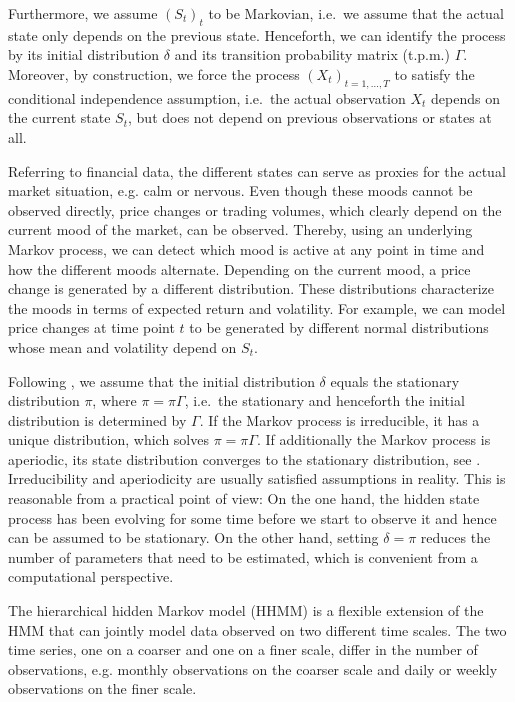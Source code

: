 \documentclass[article]{jss}
\begin{document}
Furthermore, we assume $(S_t)_t$ to be Markovian, i.e.\ we assume that the actual state only depends on the previous state. Henceforth, we can identify the process by its initial distribution $\delta$ and its transition probability matrix (t.p.m.) $\Gamma$. Moreover, by construction, we force the process $(X_t)_{t = 1, \ldots, T}$ to satisfy the conditional independence assumption, i.e.\ the actual observation $X_t$ depends on the current state $S_t$, but does not depend on previous observations or states at all.

Referring to financial data, the different states can serve as proxies for the actual market situation, e.g. calm or nervous. Even though these moods cannot be observed directly, price changes or trading volumes, which clearly depend on the current mood of the market, can be observed. Thereby, using an underlying Markov process, we can detect which mood is active at any point in time and how the different moods alternate. Depending on the current mood, a price change is generated by a different distribution. These distributions characterize the moods in terms of expected return and volatility. For example, we can model price changes at time point $t$ to be generated by different normal distributions whose mean and volatility depend on $S_t$.

Following \cite{zuc16}, we assume that the initial distribution $\delta$ equals the stationary distribution $\pi$, where $\pi = \pi \Gamma$, i.e.\ the stationary and henceforth the initial distribution is determined by $\Gamma$. If the Markov process is irreducible, it has a unique distribution, which solves $\pi = \pi \Gamma$. If
additionally the Markov process is aperiodic, its state distribution converges to the stationary distribution, see \cite{nor97}. Irreducibility and aperiodicity are usually satisfied assumptions in reality. This is reasonable from a practical point of view: On the one hand, the hidden state process has been evolving for some time before we start to observe it and hence can be assumed to be stationary. On the other hand, setting $\delta=\pi$ reduces the number of parameters that need to be estimated, which is convenient from a computational perspective.

The hierarchical hidden Markov model (HHMM) is a flexible extension of the HMM  that can jointly model data observed on two different time scales. The two time series, one on a coarser and one on a finer scale, differ in the number of observations, e.g. monthly observations on the coarser scale and daily or weekly observations on the finer scale. 
\end{document}
